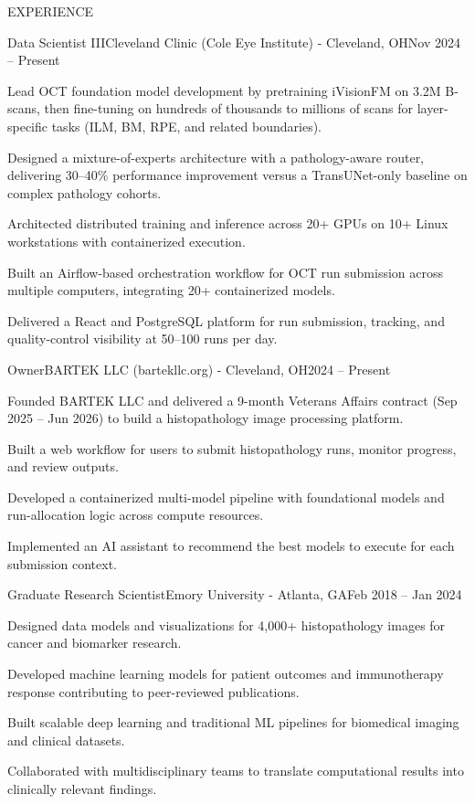 \documentclass{resume} %
\begin{document}
\begin{rSection}{EXPERIENCE}

  \begin{rWork}{Data Scientist III}{Cleveland Clinic (Cole Eye Institute) - Cleveland, OH}{Nov 2024 -- Present}
    \item Lead OCT foundation model development by pretraining iVisionFM on 3.2M B-scans, then fine-tuning on hundreds of thousands to millions of scans for layer-specific tasks (ILM, BM, RPE, and related boundaries).
    \item Designed a mixture-of-experts architecture with a pathology-aware router, delivering 30--40\% performance improvement versus a TransUNet-only baseline on complex pathology cohorts.
    \item Architected distributed training and inference across 20+ GPUs on 10+ Linux workstations with containerized execution.
    \item Built an Airflow-based orchestration workflow for OCT run submission across multiple computers, integrating 20+ containerized models.
    \item Delivered a React and PostgreSQL platform for run submission, tracking, and quality-control visibility at 50--100 runs per day.
  \end{rWork}

  \begin{rWork}{Owner}{BARTEK LLC (bartekllc.org) - Cleveland, OH}{2024 -- Present}
    \item Founded BARTEK LLC and delivered a 9-month Veterans Affairs contract (Sep 2025 -- Jun 2026) to build a histopathology image processing platform.
    \item Built a web workflow for users to submit histopathology runs, monitor progress, and review outputs.
    \item Developed a containerized multi-model pipeline with foundational models and run-allocation logic across compute resources.
    \item Implemented an AI assistant to recommend the best models to execute for each submission context.
  \end{rWork}
  
  \begin{rWork}{Graduate Research Scientist}{Emory University - Atlanta, GA}{Feb 2018 -- Jan 2024}
    \item Designed data models and visualizations for 4,000+ histopathology images for cancer and biomarker research.
    \item Developed machine learning models for patient outcomes and immunotherapy response contributing to peer-reviewed publications.
    \item Built scalable deep learning and traditional ML pipelines for biomedical imaging and clinical datasets.
    \item Collaborated with multidisciplinary teams to translate computational results into clinically relevant findings.
  \end{rWork}


\end{rSection}
\end{document}

